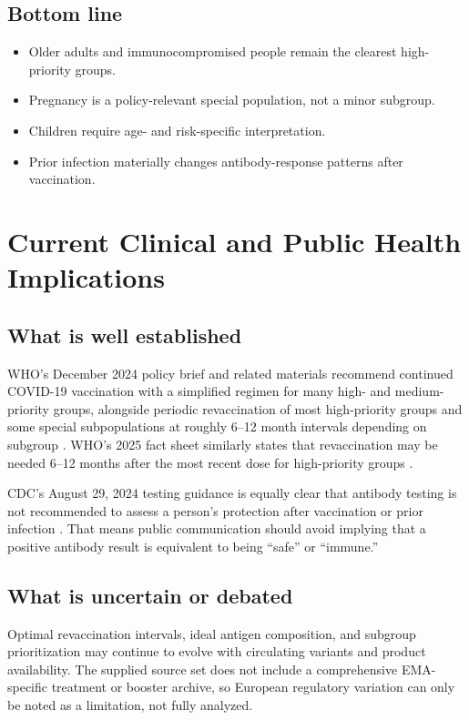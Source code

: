 \documentclass[12pt]{article}
\begin{document}
\subsection*{Bottom line}
\begin{itemize}[leftmargin=1.5em]
    \item Older adults and immunocompromised people remain the clearest high-priority groups.
    \item Pregnancy is a policy-relevant special population, not a minor subgroup.
    \item Children require age- and risk-specific interpretation.
    \item Prior infection materially changes antibody-response patterns after vaccination.
\end{itemize}

\section{Current Clinical and Public Health Implications}
\subsection*{What is well established}
WHO's December 2024 policy brief and related materials recommend continued COVID-19 vaccination with a simplified regimen for many high- and medium-priority groups, alongside periodic revaccination of most high-priority groups and some special subpopulations at roughly 6--12 month intervals depending on subgroup \cite{ref9,ref10,ref11}. WHO's 2025 fact sheet similarly states that revaccination may be needed 6--12 months after the most recent dose for high-priority groups \cite{ref12}.

CDC's August 29, 2024 testing guidance is equally clear that antibody testing is not recommended to assess a person's protection after vaccination or prior infection \cite{ref1}. That means public communication should avoid implying that a positive antibody result is equivalent to being ``safe'' or ``immune.''

\subsection*{What is uncertain or debated}
Optimal revaccination intervals, ideal antigen composition, and subgroup prioritization may continue to evolve with circulating variants and product availability. The supplied source set does not include a comprehensive EMA-specific treatment or booster archive, so European regulatory variation can only be noted as a limitation, not fully analyzed.
\end{document}
